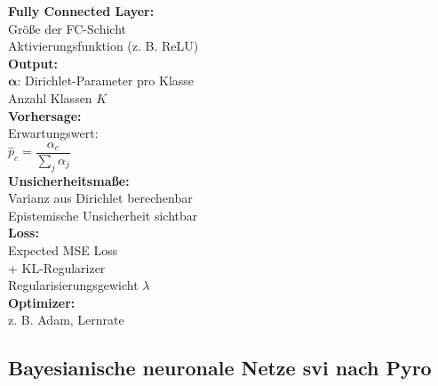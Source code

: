 \begin{center}
\begin{minipage}[t]{0.48\textwidth}
\textbf{Fully Connected Layer:} \\
Größe der FC-Schicht \\
Aktivierungsfunktion (z. B. ReLU) \\[4pt]

\textbf{Output:} \\
$\boldsymbol{\alpha}$: Dirichlet-Parameter pro Klasse \\
Anzahl Klassen $K$ \\[4pt]

\textbf{Vorhersage:} \\
Erwartungswert: \\
$\hat{p}_c = \dfrac{\alpha_c}{\sum_j \alpha_j}$ \\[4pt]

\textbf{Unsicherheitsmaße:} \\
Varianz aus Dirichlet berechenbar \\
Epistemische Unsicherheit sichtbar \\[4pt]

\textbf{Loss:} \\
Expected MSE Loss \\
+ KL-Regularizer \\
Regularisierungsgewicht $\lambda$ \\[4pt]

\textbf{Optimizer:} \\
z. B. Adam, Lernrate
\end{minipage}
\end{center}

\newpage



\subsection*{\gls{Bayesianische neuronale Netze} \gls{svi} nach Pyro \parencite{PyroPplDevelopers.2024}}

\par\noindent\\

